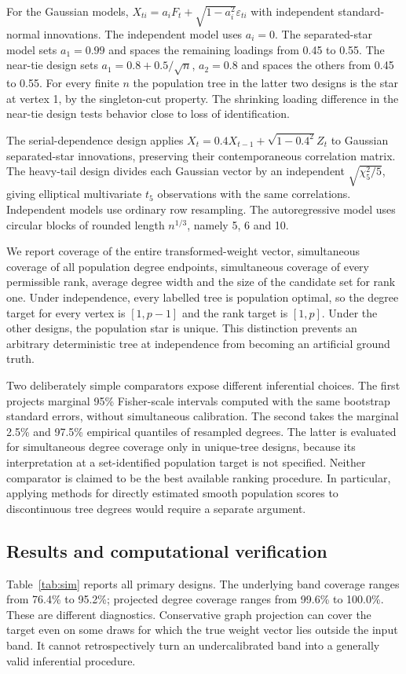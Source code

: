\documentclass[pdflatex,sn-mathphys-ay]{sn-jnl}
\theoremstyle{thmstyleone}
\theoremstyle{thmstyletwo}
\begin{document}
For the Gaussian models, $X_{ti}=a_i F_t+\sqrt{1-a_i^2}\varepsilon_{ti}$ with independent standard-normal innovations. The independent model uses $a_i=0$. The separated-star model sets $a_1=0.99$ and spaces the remaining loadings from 0.45 to 0.55. The near-tie design sets $a_1=0.8+0.5/\sqrt n$, $a_2=0.8$ and spaces the others from 0.45 to 0.55. For every finite $n$ the population tree in the latter two designs is the star at vertex 1, by the singleton-cut property. The shrinking loading difference in the near-tie design tests behavior close to loss of identification.

The serial-dependence design applies $X_t=0.4X_{t-1}+\sqrt{1-0.4^2}Z_t$ to Gaussian separated-star innovations, preserving their contemporaneous correlation matrix. The heavy-tail design divides each Gaussian vector by an independent $\sqrt{\chi^2_5/5}$, giving elliptical multivariate $t_5$ observations with the same correlations. Independent models use ordinary row resampling. The autoregressive model uses circular blocks of rounded length $n^{1/3}$, namely 5, 6 and 10.

We report coverage of the entire transformed-weight vector, simultaneous coverage of all population degree endpoints, simultaneous coverage of every permissible rank, average degree width and the size of the candidate set for rank one. Under independence, every labelled tree is population optimal, so the degree target for every vertex is $[1,p-1]$ and the rank target is $[1,p]$. Under the other designs, the population star is unique. This distinction prevents an arbitrary deterministic tree at independence from becoming an artificial ground truth.

Two deliberately simple comparators expose different inferential choices. The first projects marginal 95\% Fisher-scale intervals computed with the same bootstrap standard errors, without simultaneous calibration. The second takes the marginal 2.5\% and 97.5\% empirical quantiles of resampled degrees. The latter is evaluated for simultaneous degree coverage only in unique-tree designs, because its interpretation at a set-identified population target is not specified. Neither comparator is claimed to be the best available ranking procedure. In particular, applying methods for directly estimated smooth population scores to discontinuous tree degrees would require a separate argument.

\subsection{Results and computational verification}
Table~\ref{tab:sim} reports all primary designs. The underlying band coverage ranges from 76.4\% to 95.2\%; projected degree coverage ranges from 99.6\% to 100.0\%. These are different diagnostics. Conservative graph projection can cover the target even on some draws for which the true weight vector lies outside the input band. It cannot retrospectively turn an undercalibrated band into a generally valid inferential procedure.
\end{document}

